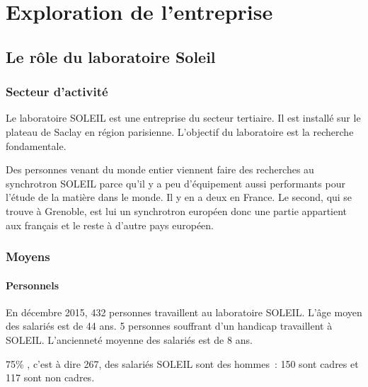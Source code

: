 \chapter{Exploration de l'entreprise}
	\minitoc






\section{Le rôle du laboratoire Soleil}

	\subsection{Secteur d'activité}
				Le laboratoire SOLEIL est une entreprise du secteur tertiaire. Il est installé sur le plateau de Saclay en région parisienne. L'objectif du laboratoire est la recherche fondamentale.
				
				Des personnes venant du monde entier viennent faire des recherches au synchrotron SOLEIL parce qu'il y a peu d'équipement aussi performants pour l'étude de la matière dans le monde. Il y en a deux en France. Le second, qui se trouve à Grenoble, est lui un synchrotron européen donc une partie appartient aux français et le reste à d'autre pays européen.

	\subsection{Moyens}
		
		\subsubsection{Personnels}
				En décembre 2015, 432 personnes travaillent au laboratoire SOLEIL. L'âge moyen des salariés est de 44 ans. 5 personnes souffrant d'un handicap travaillent à SOLEIL. L'ancienneté moyenne des salariés est de 8 ans.
				
				75\% , c'est à dire 267, des salariés SOLEIL sont des hommes~: 150 sont cadres et 117 sont non cadres.
				
